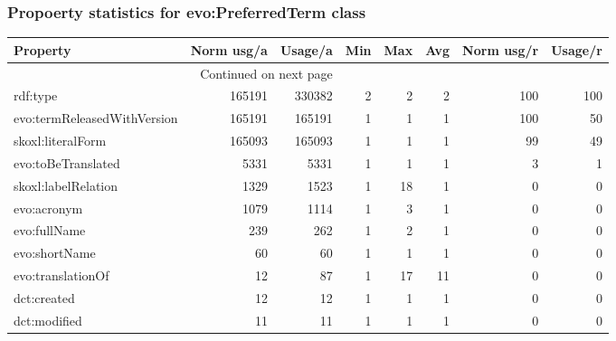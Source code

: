 \documentclass[10pt,a4paper,titlepage,final]{article}
\begin{document}
\subsubsection{Propoerty statistics for evo:PreferredTerm class}
\begin{longtable}{lrrrrrrr}
\toprule
                    Property &  Norm usg/a &  Usage/a &  Min &  Max &  Avg &  Norm usg/r &  Usage/r \\
\midrule
\endhead
\midrule
\multicolumn{3}{r}{{Continued on next page}} \\
\midrule
\endfoot

\bottomrule
\endlastfoot
                    rdf:type &      165191 &   330382 &    2 &    2 &    2 &         100 &      100 \\
 evo:termReleasedWithVersion &      165191 &   165191 &    1 &    1 &    1 &         100 &       50 \\
           skoxl:literalForm &      165093 &   165093 &    1 &    1 &    1 &          99 &       49 \\
          evo:toBeTranslated &        5331 &     5331 &    1 &    1 &    1 &           3 &        1 \\
         skoxl:labelRelation &        1329 &     1523 &    1 &   18 &    1 &           0 &        0 \\
                 evo:acronym &        1079 &     1114 &    1 &    3 &    1 &           0 &        0 \\
                evo:fullName &         239 &      262 &    1 &    2 &    1 &           0 &        0 \\
               evo:shortName &          60 &       60 &    1 &    1 &    1 &           0 &        0 \\
           evo:translationOf &          12 &       87 &    1 &   17 &   11 &           0 &        0 \\
                 dct:created &          12 &       12 &    1 &    1 &    1 &           0 &        0 \\
                dct:modified &          11 &       11 &    1 &    1 &    1 &           0 &        0 \\
\end{longtable}
\end{document}
